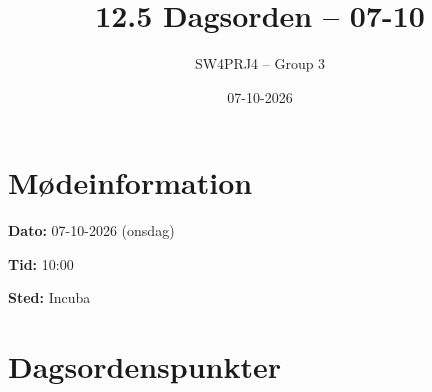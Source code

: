 \documentclass[a4paper,11pt]{article}
\title{12.5 Dagsorden -- 07-10}
\author{SW4PRJ4 -- Group 3}
\date{07-10-2026}
\begin{document}
\maketitle

\section*{Mødeinformation}

\textbf{Dato:} 07-10-2026 (onsdag)

\textbf{Tid:} 10:00

\textbf{Sted:} Incuba

\section*{Dagsordenspunkter}
\end{document}
